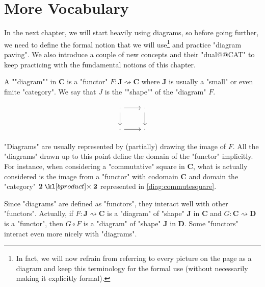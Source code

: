 \documentclass[main.tex]{subfiles}
\begin{document}
\section{More Vocabulary}
In the next chapter, we will start heavily using diagrams, so before going further, we need to define the formal notion that we will use\footnote{In fact, we will now refrain from referring to every picture on the page as a diagram and keep this terminology for the formal use (without necessarily making it explicitly formal).} and practice "diagram paving". We also introduce a couple of new concepts and their "dual@@CAT" to keep practicing with the fundamental notions of this chapter.%
\begin{defn}[Diagram]\label{defn:diagram}
    \AP A ""diagram"" in $\mathbf{C}$ is a "functor" $F:\mathbf{J}\rightsquigarrow \mathbf{C}$ where $\mathbf{J}$ is usually a "small" or even finite "category". \AP We say that $J$ is the ""shape"" of the "diagram" $F$.
\end{defn}
\begin{rem}
\begin{marginfigure}
    \begin{equation}\label{diag:commsquare}
        \begin{tikzcd}
            \cdot \arrow[r] \arrow[d] & \cdot \arrow[d] \\
            \cdot \arrow[r] & \cdot
        \end{tikzcd}
    \end{equation}
\end{marginfigure}
"Diagrams" are usually represented by (partially) drawing the image of $F$. All the "diagrams" drawn up to this point define the domain of the "functor" implicitly. For instance, when considering a "commutative" square in $\mathbf{C}$, what is actually considered is the image from a "functor" with codomain $\mathbf{C}$ and domain the "category" $\mathbf{2}\product \mathbf{2}$ represented in \eqref{diag:commutesquare}.
\end{rem}
Since "diagrams" are defined as "functors", they interact well with other "functors". Actually, if $F: \mathbf{J} \rightsquigarrow \mathbf{C}$ is a "diagram" of "shape" $\mathbf{J}$ in $\mathbf{C}$ and $G: \mathbf{C}\rightsquigarrow \mathbf{D}$ is a "functor", then $G\circ F$ is a "diagram" of "shape" $\mathbf{J}$ in $\mathbf{D}$. Some "functors" interact even more nicely with "diagrams".
\end{document}
